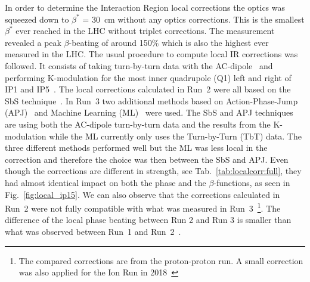 \documentclass{cernatsnote}
\begin{document}
In order to determine the Interaction Region local corrections the optics was squeezed down to $\beta^*$ = 30~cm without any optics corrections. This is the smallest $\beta^*$ ever reached in the LHC without triplet corrections. The measurement revealed a peak $\beta$-beating of around 150\% which is also the highest ever measured in the LHC. The usual procedure to compute local IR corrections was followed. It consists of taking turn-by-turn data with the AC-dipole~\cite{record} and performing K-modulation for the most inner quadrupole (Q1) left and right of IP1 and IP5~\cite{felixkmod}. 
The local corrections calculated in Run~2 were all based on the SbS technique~\cite{tomasCERNLargeHadron2010, jaime_rdt}. In Run~3 two additional methods based on Action-Phase-Jump (APJ)~\cite{cardona17, cardona20,Garcia_Morales:IPAC21-MOPAB186, ipac2022_apj} and Machine Learning (ML)~\cite{IPAC2020Fol , epj_efol, efol_mlcorr_this_conference} were used. The SbS and APJ techniques are using both the AC-dipole turn-by-turn data and the results from the K-modulation while the ML currently only uses the Turn-by-Turn (TbT) data. The three different methods performed well but the ML was less local in the correction and therefore the choice was then between the SbS and APJ. Even though the corrections are different in strength, see Tab.~\ref{tab:localcorr:full}, they had almost identical impact on both the phase and the $\beta$-functions, as seen in Fig.~\ref{fig:local_ip15}. We can also observe that the corrections calculated in Run~2 were not fully compatible with what was measured in Run~3~\footnote{The compared corrections are from the proton-proton run. A small correction was also applied for the Ion Run in  2018~\cite{tobias_evian19}}. The difference of the local phase beating between Run 2 and Run 3 is smaller than what was observed between Run~1 and Run~2~\cite{evian_2015_langer}.
\end{document}
